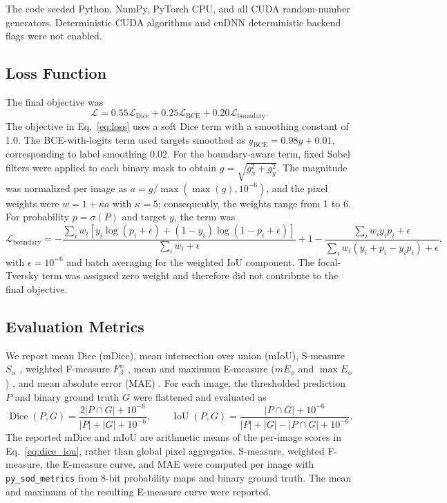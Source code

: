 The code seeded Python, NumPy, PyTorch CPU, and all CUDA random-number generators.
Deterministic CUDA algorithms and cuDNN deterministic backend flags were not enabled.

\subsection{Loss Function}\label{loss-function}

The final objective was
\begin{equation}
\mathcal{L}=0.55\mathcal{L}_{\mathrm{Dice}}
+0.25\mathcal{L}_{\mathrm{BCE}}
+0.20\mathcal{L}_{\mathrm{boundary}}.
\label{eq:loss}
\end{equation}
The objective in Eq.~\eqref{eq:loss} uses a soft Dice term with a smoothing constant of 1.0. The BCE-with-logits
term used targets smoothed as
$y_{\mathrm{BCE}}=0.98y+0.01$, corresponding to label smoothing 0.02.
For the boundary-aware term, fixed Sobel filters were applied to each binary mask to
obtain $g=\sqrt{g_x^2+g_y^2}$. The magnitude was normalized per image as
$a=g/\max(\max(g),10^{-6})$, and the pixel weights were
$w=1+\kappa a$ with $\kappa=5$; consequently, the weights range from 1 to 6.
For probability $p=\sigma(P)$ and target $y$, the term was
\begin{equation}
\mathcal{L}_{\mathrm{boundary}}
=-\frac{\sum_i w_i[y_i\log(p_i+\epsilon)+(1-y_i)\log(1-p_i+\epsilon)]}
{\sum_i w_i+\epsilon}
+1-\frac{\sum_i w_i y_i p_i+\epsilon}
{\sum_i w_i(y_i+p_i-y_ip_i)+\epsilon},
\label{eq:boundary_loss}
\end{equation}
with $\epsilon=10^{-6}$ and batch averaging for the weighted IoU component. The
focal-Tversky term was assigned zero weight and therefore did not contribute to the
final objective.

\subsection{Evaluation Metrics}\label{evaluation-metrics}

We report mean Dice (mDice), mean intersection over union (mIoU),
S-measure $S_{\alpha}$ \cite{smeasure}, weighted F-measure
$F_{\beta}^{w}$ \cite{weightedfmeasure}, mean and maximum E-measure ($mE_{\phi}$ and
$\max E_{\phi}$) \cite{emeasure}, and mean absolute error (MAE)
\cite{saliencyfilters}. For each image, the thresholded prediction $P$
and binary ground truth $G$ were flattened and evaluated as
\begin{equation}
\operatorname{Dice}(P,G)=
\frac{2|P\cap G|+10^{-6}}{|P|+|G|+10^{-6}},
\qquad
\operatorname{IoU}(P,G)=
\frac{|P\cap G|+10^{-6}}{|P|+|G|-|P\cap G|+10^{-6}}.
\label{eq:dice_iou}
\end{equation}
The reported mDice and mIoU are arithmetic means of the per-image scores in Eq.~\eqref{eq:dice_iou}, rather than global pixel aggregates. S-measure, weighted
F-measure, the E-measure curve, and MAE were computed per image with
\texttt{py\_sod\_metrics} from 8-bit probability maps and binary ground
truth. The mean and maximum of the resulting E-measure curve were
reported.

